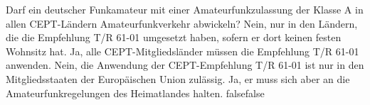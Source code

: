     {Darf ein deutscher Funkamateur mit einer Amateurfunkzulassung der Klasse A in allen CEPT-Ländern Amateurfunkverkehr abwickeln?}
    {Nein, nur in den Ländern, die die Empfehlung T/R 61-01 umgesetzt haben, sofern er dort keinen festen Wohnsitz hat.}
    {Ja, alle CEPT-Mitgliedsländer müssen die Empfehlung T/R 61-01 anwenden.}
    {Nein, die Anwendung der CEPT-Empfehlung T/R 61-01 ist nur in den Mitgliedsstaaten der Europäischen Union zulässig.}
    {Ja, er muss sich aber an die Amateurfunkregelungen des Heimatlandes halten.}
    {false}{false}